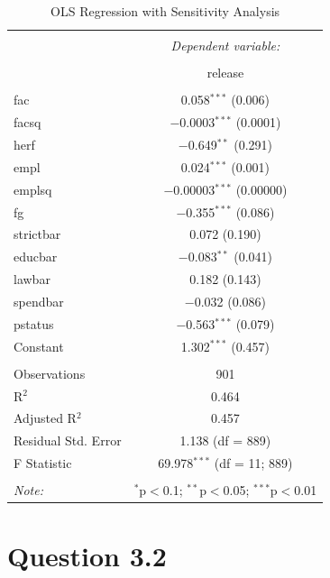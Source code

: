 \documentclass[12pt, oneside]{article}
\begin{document}
\begin{table}[!htbp] \centering 
    \caption{OLS Regression with Sensitivity Analysis} 
    \label{} 
  \begin{tabular}{@{\extracolsep{5pt}}lc} 
  \\[-1.8ex]\hline 
  \hline \\[-1.8ex] 
   & \multicolumn{1}{c}{\textit{Dependent variable:}} \\ 
  \cline{2-2} 
  \\[-1.8ex] & release \\ 
  \hline \\[-1.8ex] 
   fac & 0.058$^{***}$ (0.006) \\ 
    facsq & $-$0.0003$^{***}$ (0.0001) \\ 
    herf & $-$0.649$^{**}$ (0.291) \\ 
    empl & 0.024$^{***}$ (0.001) \\ 
    emplsq & $-$0.00003$^{***}$ (0.00000) \\ 
    fg & $-$0.355$^{***}$ (0.086) \\ 
    strictbar & 0.072 (0.190) \\ 
    educbar & $-$0.083$^{**}$ (0.041) \\ 
    lawbar & 0.182 (0.143) \\ 
    spendbar & $-$0.032 (0.086) \\ 
    pstatus & $-$0.563$^{***}$ (0.079) \\ 
    Constant & 1.302$^{***}$ (0.457) \\ 
   \hline \\[-1.8ex] 
  Observations & 901 \\ 
  R$^{2}$ & 0.464 \\ 
  Adjusted R$^{2}$ & 0.457 \\ 
  Residual Std. Error & 1.138 (df = 889) \\ 
  F Statistic & 69.978$^{***}$ (df = 11; 889) \\ 
  \hline 
  \hline \\[-1.8ex] 
  \textit{Note:}  & \multicolumn{1}{r}{$^{*}$p$<$0.1; $^{**}$p$<$0.05; $^{***}$p$<$0.01} \\ 
  \end{tabular} 
  \end{table} 

\section{Question 3.2}
\end{document}
